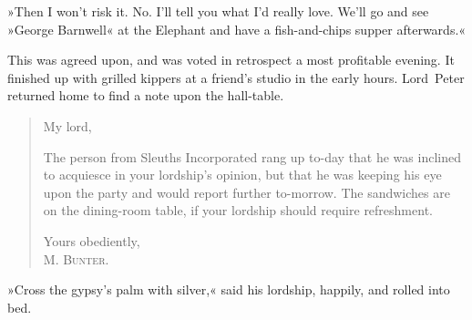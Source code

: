 »Then I won't risk it. No. I'll tell you what I'd really love. We'll go and see »George Barnwell« at the Elephant and have a fish-and-chips supper afterwards.«

This was agreed upon, and was voted in retrospect a most profitable evening. It finished up with grilled kippers at a friend's studio in the early hours. Lord~Peter returned home to find a note upon the hall-table.

\begin{quotation}
\noindent My lord,

\indent The person from Sleuths Incorporated rang up to-day that he was inclined to acquiesce in your lordship's opinion, but that he was keeping his eye upon the party and would report further to-morrow. The sandwiches are on the dining-room table, if your lordship should require refreshment.

\begin{flushright}
Yours obediently,\\
\textsc{M. Bunter.}
\end{flushright}
\end{quotation}

»Cross the gypsy's palm with silver,« said his lordship, happily, and rolled into bed.